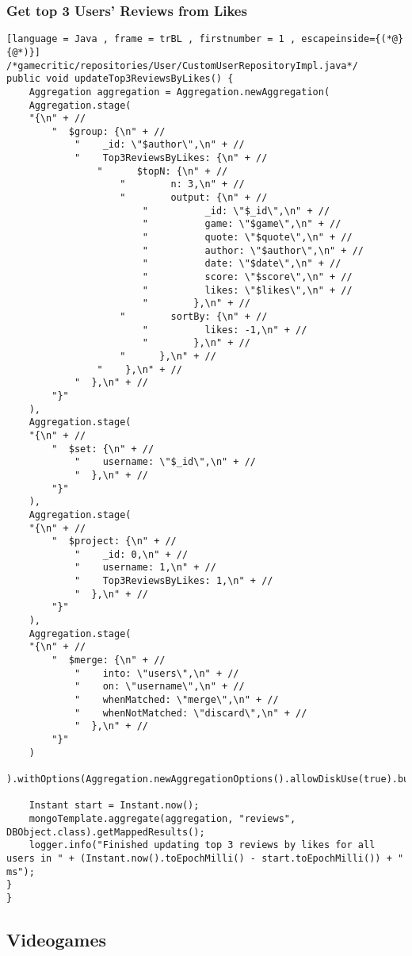 \subsubsection{Get top 3 Users' Reviews from Likes}
\begin{lstlisting}[language = Java , frame = trBL , firstnumber = 1 , escapeinside={(*@}{@*)}]
/*gamecritic/repositories/User/CustomUserRepositoryImpl.java*/
public void updateTop3ReviewsByLikes() {
	Aggregation aggregation = Aggregation.newAggregation(
	Aggregation.stage(
	"{\n" + //
		"  $group: {\n" + //
			"    _id: \"$author\",\n" + //
			"    Top3ReviewsByLikes: {\n" + //
				"      $topN: {\n" + //
					"        n: 3,\n" + //
					"        output: {\n" + //
						"          _id: \"$_id\",\n" + //
						"          game: \"$game\",\n" + //
						"          quote: \"$quote\",\n" + //
						"          author: \"$author\",\n" + //
						"          date: \"$date\",\n" + //
						"          score: \"$score\",\n" + //
						"          likes: \"$likes\",\n" + //
						"        },\n" + //
					"        sortBy: {\n" + //
						"          likes: -1,\n" + //
						"        },\n" + //
					"      },\n" + //
				"    },\n" + //
			"  },\n" + //
		"}"
	),
	Aggregation.stage(
	"{\n" + //
		"  $set: {\n" + //
			"    username: \"$_id\",\n" + //
			"  },\n" + //
		"}"
	),
	Aggregation.stage(
	"{\n" + //
		"  $project: {\n" + //
			"    _id: 0,\n" + //
			"    username: 1,\n" + //
			"    Top3ReviewsByLikes: 1,\n" + //
			"  },\n" + //
		"}"
	),
	Aggregation.stage(
	"{\n" + //
		"  $merge: {\n" + //
			"    into: \"users\",\n" + //
			"    on: \"username\",\n" + //
			"    whenMatched: \"merge\",\n" + //
			"    whenNotMatched: \"discard\",\n" + //
			"  },\n" + //
		"}"
	)
	).withOptions(Aggregation.newAggregationOptions().allowDiskUse(true).build());
	
	Instant start = Instant.now();
	mongoTemplate.aggregate(aggregation, "reviews", DBObject.class).getMappedResults();
	logger.info("Finished updating top 3 reviews by likes for all users in " + (Instant.now().toEpochMilli() - start.toEpochMilli()) + " ms");
}
}
\end{lstlisting}
\subsection{Videogames}
